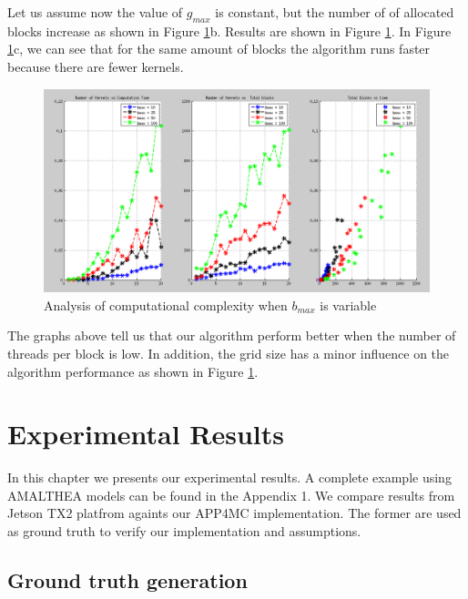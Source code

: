 \documentclass[
  12pt,
  a4paperpaper,
]{report}
\begin{document}
Let us assume now the value of \(g_{max}\) is constant, but the number
of of allocated blocks increase as shown in Figure
\ref{img:bmax_variable}b. Results are shown in Figure
\ref{img:bmax_variable}. In Figure \ref{img:bmax_variable}c, we can see
that for the same amount of blocks the algorithm runs faster because
there are fewer kernels.

\begin{figure}
\centering
\includegraphics[width=1\textwidth,height=\textheight]{source/figures/bmax_variable.png}
\caption{Analysis of computational complexity when \(b_{max}\) is
variable \label{img:bmax_variable}}
\end{figure}

The graphs above tell us that our algorithm perform better when the
number of threads per block is low. In addition, the grid size has a
minor influence on the algorithm performance as shown in Figure
\ref{img:bmax_variable}.

\hypertarget{experimental-results}{%
\chapter{Experimental Results}\label{experimental-results}}

In this chapter we presents our experimental results. A complete example
using AMALTHEA models can be found in the Appendix 1. We compare results
from Jetson TX2 platfrom againts our APP4MC implementation. The former
are used as ground truth to verify our implementation and assumptions.

\hypertarget{ground-truth-generation}{%
\section{Ground truth generation}\label{ground-truth-generation}}
\end{document}
